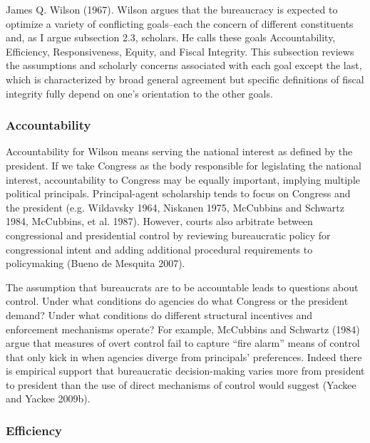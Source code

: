 James Q. Wilson (1967). Wilson argues that the bureaucracy is expected to optimize a variety of conflicting goals--each the concern of different constituents and, as I argue subsection 2.3, scholars. He calls these goals Accountability, Efficiency, Responsiveness, Equity, and Fiscal Integrity. This subsection reviews the assumptions and scholarly concerns associated with each goal except the last, which is characterized by broad general agreement but specific definitions of fiscal integrity fully depend on one's orientation to the other goals. 

\subsubsection{Accountability}

Accountability for Wilson means serving the national interest as defined by the president. If we take Congress as the body responsible for legislating the national interest, accountability to Congress may be equally important, implying multiple political principals. Principal-agent scholarship tends to focus on Congress and the president (e.g. Wildavsky 1964, Niskanen 1975, McCubbins and Schwartz 1984, McCubbins, et al. 1987). However, courts also arbitrate between congressional and presidential control by reviewing bureaucratic policy for congressional intent and adding additional procedural requirements to policymaking (Bueno de Mesquita 2007). 

The assumption that bureaucrats are to be accountable leads to questions about control. Under what conditions do agencies do what Congress or the president demand? Under what conditions do different structural incentives and enforcement mechanisms operate? For example, McCubbins and Schwartz (1984) argue that measures of overt control fail to capture ``fire alarm'' means of control that only kick in when agencies diverge from principals' preferences. Indeed there is empirical support that bureaucratic decision-making varies more from president to president than the use of direct mechanisms of control would suggest (Yackee and Yackee 2009b).


\subsubsection{Efficiency}

